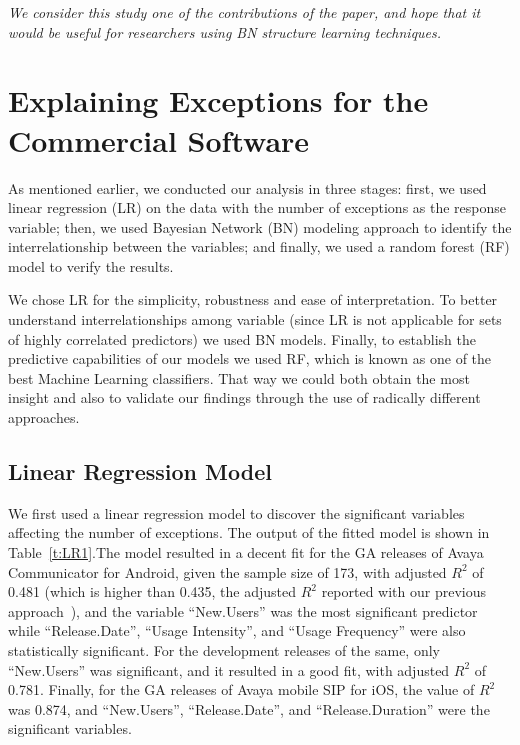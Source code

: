 \documentclass[smallextended]{svjour3}       %
\begin{document}
\emph{We consider this study one of the contributions of the paper, and hope that it 
would be useful for researchers using BN structure learning techniques.}

\vspace{-10pt}
\section{Explaining Exceptions for the Commercial Software}\label{s:explain}
As mentioned earlier, we conducted our analysis in three stages: first, we used linear regression (LR) on the data with the number of exceptions as the response variable; then, we used Bayesian Network (BN) modeling approach to identify the interrelationship between the variables; and finally, we used a random forest (RF) model to verify the results. 

We chose LR for the simplicity, robustness and ease of interpretation. To better understand interrelationships among variable (since LR is not applicable for sets of highly correlated predictors) we used BN models. Finally, to establish the 
predictive capabilities of our models we used RF, which is known as one of the best Machine Learning classifiers. That way we could both obtain the most insight and also to validate our findings through the use of radically different approaches.

\vspace{-10pt}
\subsection{Linear Regression Model}
We first used a linear regression model to discover the significant variables affecting the number of exceptions. The  output  of the fitted model is shown in Table~\ref{t:LR1}.The model resulted in a decent fit for the GA releases of Avaya Communicator for Android, given the sample size of 173, with adjusted $R^2$ of 0.481 (which is higher than  0.435, the adjusted $R^2$  reported with our previous approach~\cite{dey2018modeling}), and the variable ``New.Users'' was the most significant predictor while ``Release.Date'', ``Usage Intensity'', and ``Usage Frequency'' were also statistically significant. For the development releases of the same, only ``New.Users'' was significant, and it resulted in a good fit, with adjusted $R^2$ of 0.781.
Finally, for the GA releases of Avaya mobile SIP for iOS, the value of $R^2$ was 0.874, and ``New.Users'', ``Release.Date'', and ``Release.Duration'' were the significant variables.
\end{document}
